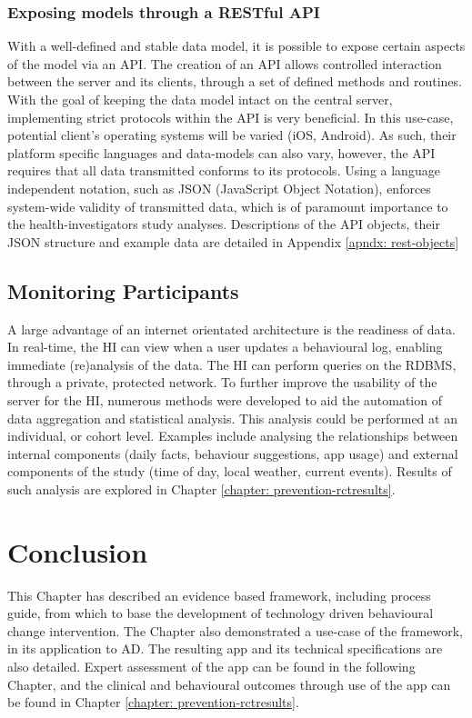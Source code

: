 \subsubsection{Exposing models through a RESTful API} \label{subsection-api}
With a well-defined and stable data model, it is possible to expose certain aspects of the model via an API. The creation of an API allows controlled interaction between the server and its clients, through a set of defined methods and routines. With the goal of keeping the data model intact on the central server, implementing strict protocols within the API is very beneficial. In this use-case, potential client's operating systems will be varied (iOS, Android). As such, their platform specific languages and data-models can also vary, however, the API requires that all data transmitted conforms to its protocols. Using a language independent notation, such as JSON (JavaScript Object Notation), enforces system-wide validity of transmitted data, which is of paramount importance to the health-investigators study analyses. Descriptions of the API objects, their JSON structure and example data are detailed in Appendix \ref{apndx: rest-objects}

\subsection{Monitoring Participants}
A large advantage of an internet orientated architecture is the readiness of data. In real-time, the HI can view when a user updates a behavioural log, enabling immediate (re)analysis of the data. The HI can perform queries on the RDBMS, through a private, protected network. To further improve the usability of the server for the HI, numerous methods were developed to aid the automation of data aggregation and statistical analysis. This analysis could be performed at an individual, or cohort level.
Examples include analysing the relationships between internal components (daily facts, behaviour suggestions, app usage) and external components of the study (time of day, local weather, current events). Results of such analysis are explored in Chapter \ref{chapter: prevention-rctresults}.

\section{Conclusion}
This Chapter has described an evidence based framework, including process guide, from which to base the development of technology driven behavioural change intervention. The Chapter also demonstrated a use-case of the framework, in its application to AD. The resulting app and its technical specifications are also detailed. Expert assessment of the app can be found in the following Chapter, and the clinical and behavioural outcomes through use of the app can be found in Chapter \ref{chapter: prevention-rctresults}.
